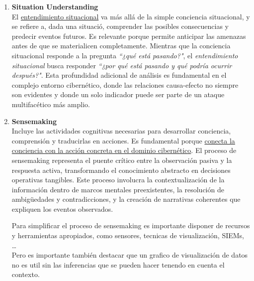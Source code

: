 \begin{enumerate}[resume]

\item \textbf{Situation Understanding} \\
El \ul{entendimiento situacional} va más allá de la simple conciencia situacional, y se refiere a, dada una situació, comprender las posibles consecuencias y predecir eventos futuros. Es relevante porque permite anticipar las amenazas antes de que se materialicen completamente. Mientras que la conciencia situacional responde a la pregunta \textit{``¿qué está pasando?"}, el \textit{entendimiento situacional} busca responder \textit{``¿por qué está pasando y qué podría ocurrir después?"}. Esta profundidad adicional de análisis es fundamental en el complejo entorno cibernético, donde las relaciones causa-efecto no siempre son evidentes y donde un solo indicador puede ser parte de un ataque multifacético más amplio.
\nl


\item \textbf{Sensemaking} \\
Incluye las actividades cognitivas necesarias para desarrollar conciencia, comprensión y traducirlas en acciones. Es fundamental porque \ul{conecta la conciencia con la acción concreta en el dominio cibernético}. El proceso de sensemaking representa el puente crítico entre la observación pasiva y la respuesta activa, transformando el conocimiento abstracto en decisiones operativas tangibles. Este proceso involucra la contextualización de la información dentro de marcos mentales preexistentes, la resolución de ambigüedades y contradicciones, y la creación de narrativas coherentes que expliquen los eventos observados.

Para simplificar el proceso de sensemaking es importante disponer de recursos y herramientas apropiados, como sensores, tecnicas de visualización, SIEMs, \dots\\
Pero es importante también destacar que un grafico de visualización de datos no es util sin las inferencias que se pueden hacer tenendo en cuenta el contexto. 
\end{enumerate}

